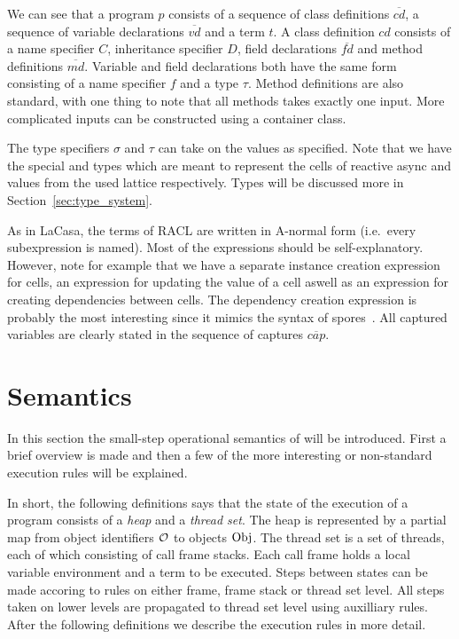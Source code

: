 We can see that a program $p$ consists of a sequence of class definitions
$\overline{cd}$, a sequence of variable declarations $\overline{vd}$ and a term
$t$. A class definition $cd$ consists of a name specifier $C$, inheritance
specifier $D$, field declarations $\overline{fd}$ and method definitions
$\overline{md}$. Variable and field declarations both have the same form
consisting of a name specifier $f$ and a type $\tau$. Method definitions are
also standard, with one thing to note that all methods takes exactly one input.
More complicated inputs can be constructed using a container class.

The type specifiers $\sigma$ and $\tau$ can take on the values as specified.
Note that we have the special \CellType{} and \LatType{} types which are meant
to represent the cells of reactive async and values from the used lattice
respectively. Types will be discussed more in Section~\ref{sec:type_system}.

As in LaCasa, the terms of RACL are written in A-normal form (i.e.\ every
subexpression is named). Most of the expressions should be self-explanatory.
However, note for example that we have a separate instance creation expression
for cells, an expression for updating the value of a cell aswell as an
expression for creating dependencies between cells. The dependency creation
expression is probably the most interesting since it mimics the syntax of
spores~\parencite{conf/ecoop/MillerHO14}. All captured variables are clearly
stated in the sequence of captures $\overline{cap}$. 

\section{Semantics}%
\label{sec:semantics}

In this section the small-step operational semantics of \RACL{} will be
introduced. First a brief overview is made and then a few of the more
interesting or non-standard execution rules will be explained.

In short, the following definitions says that the state of the execution of a
\RACL{} program consists of a \emph{heap} and a \emph{thread set}. The heap is
represented by a partial map from object identifiers $\mathcal{O}$ to objects
$\mathrm{Obj}$. The thread set is a set of threads, each of which consisting of call
frame stacks. Each call frame holds a local variable environment and a term to
be executed. Steps between states can be made accoring to rules on either frame,
frame stack or thread set level. All steps taken on lower levels are propagated
to thread set level using auxilliary rules. After the following definitions we
describe the execution rules in more detail.

